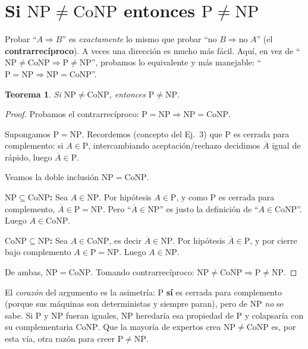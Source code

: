 \documentclass[11pt,a4paper]{article}
\theoremstyle{plain}
\newtheorem{teorema}{Teorema}
\theoremstyle{definition}
\newcommand{\NP}{\mathrm{NP}}
\newcommand{\coNP}{\mathrm{CoNP}}
\newcommand{\Pclass}{\mathrm{P}}
\begin{document}
\section{Si $\NP\neq\coNP$ entonces $\Pclass\neq\NP$}

\begin{concepto}
Probar ``$A\Rightarrow B$'' es \emph{exactamente} lo mismo que probar
``$\text{no }B\Rightarrow \text{no }A$'' (el \textbf{contrarrec\'iproco}). A veces una
direcci\'on es mucho m\'as f\'acil. Aqu\'i, en vez de ``$\NP\neq\coNP \Rightarrow
\Pclass\neq\NP$'', probamos lo equivalente y m\'as manejable:
``$\Pclass=\NP \Rightarrow \NP=\coNP$''.
\end{concepto}

\begin{teorema}
Si $\NP\neq\coNP$, entonces $\Pclass\neq\NP$.
\end{teorema}

\begin{proof}
Probamos el contrarrec\'iproco: $\Pclass=\NP \Rightarrow \NP=\coNP$.

Supongamos $\Pclass=\NP$. Recordemos (concepto del Ej.\ 3) que $\Pclass$ es cerrada
para complemento: si $A\in\Pclass$, intercambiando aceptaci\'on/rechazo decidimos
$\overline{A}$ igual de r\'apido, luego $\overline{A}\in\Pclass$.

Veamos la doble inclusi\'on $\NP=\coNP$.

\textbf{$\NP\subseteq\coNP$:} Sea $A\in\NP$. Por hip\'otesis $A\in\Pclass$, y como
$\Pclass$ es cerrada para complemento, $\overline{A}\in\Pclass=\NP$. Pero
``$\overline{A}\in\NP$'' es justo la definici\'on de ``$A\in\coNP$''. Luego
$A\in\coNP$.

\textbf{$\coNP\subseteq\NP$:} Sea $A\in\coNP$, es decir $\overline{A}\in\NP$. Por
hip\'otesis $\overline{A}\in\Pclass$, y por cierre bajo complemento
$A\in\Pclass=\NP$. Luego $A\in\NP$.

De ambas, $\NP=\coNP$. Tomando contrarrec\'iproco:
$\NP\neq\coNP \Rightarrow \Pclass\neq\NP$.
\end{proof}

\begin{porque}
El \emph{coraz\'on} del argumento es la asimetr\'ia: $\Pclass$ \textbf{s\'i} es cerrada
para complemento (porque sus m\'aquinas son deterministas y siempre paran), pero de
$\NP$ \emph{no} se sabe. Si $\Pclass$ y $\NP$ fueran iguales, $\NP$ heredar\'ia esa
propiedad de $\Pclass$ y colapsar\'ia con su complementaria $\coNP$. Que la mayor\'ia
de expertos crea $\NP\neq\coNP$ es, por esta v\'ia, otra raz\'on para creer
$\Pclass\neq\NP$.
\end{porque}
\end{document}
